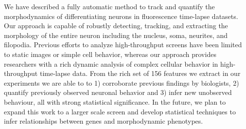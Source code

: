 We have described a  fully  automatic  method to  track  and  quantify  the
morphodynamics of  differentiating neurons in  fluorescence time-lapse
datasets.     Our  approach is capable of robustly detecting,
tracking, and extracting the morphology of  the entire neuron including 
the nucleus, soma, neurites, and filopodia.  Previous efforts to analyze
high-throughput screens have been limited to static images or simple cell
behavior, whereas our approach provides researchers with a rich dynamic 
analysis of complex cellular behavior in high-throughput time-lapse data.
From the rich set of 156 features we extract in our experiments we are able to
 to 1) corroborate previous findings by biologists, 2) quantify previously observed neuronal behavior and 3) infer new unobserved behaviour, all with strong statistical significance.
In the future, we plan to expand this
work to a larger scale screen and develop statistical techniques to 
infer relationships between genes and morphodynamic phenotypes.










